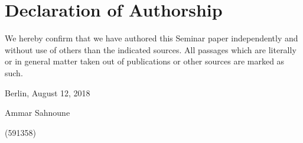 
\section*{Declaration of Authorship}

We hereby confirm that we have authored this Seminar paper independently and without use
of others than the indicated sources. All passages which are literally or in general matter taken
out of publications or other sources are marked as such.
\vspace{1cm}

Berlin, August 12, 2018 \vspace{0.5cm}

Ammar Sahnoune 

(591358)
